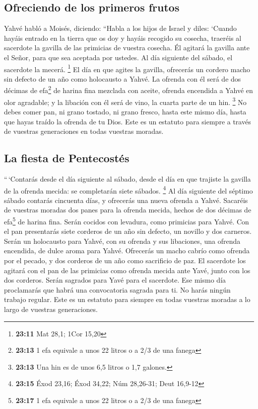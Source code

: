 \begin{paracol}{2}
\hypertarget{ofreciendo-de-los-primeros-frutos}{%
\subsection{Ofreciendo de los primeros
frutos}\label{ofreciendo-de-los-primeros-frutos}}

 Yahvé habló a Moisés, diciendo:  ``Habla a
los hijos de Israel y diles: `Cuando hayáis entrado en la tierra que os
doy y hayáis recogido su cosecha, traeréis al sacerdote la gavilla de
las primicias de vuestra cosecha.  Él agitará la gavilla
ante el Señor, para que sea aceptada por ustedes. Al día siguiente del
sábado, el sacerdote la mecerá. \footnote{\textbf{23:11} Mat 28,1; 1Cor
  15,20}  El día en que agites la gavilla, ofrecerás un
cordero macho sin defecto de un año como holocausto a Yahvé.
 La ofrenda con él será de dos décimas de efa\footnote{\textbf{23:13}
  1 efa equivale a unos 22 litros o a 2/3 de una fanega} de harina fina
mezclada con aceite, ofrenda encendida a Yahvé en olor agradable; y la
libación con él será de vino, la cuarta parte de un hin. \footnote{\textbf{23:13}
  Una hin es de unos 6,5 litros o 1,7 galones.}  No debes
comer pan, ni grano tostado, ni grano fresco, hasta este mismo día,
hasta que hayas traído la ofrenda de tu Dios. Este es un estatuto para
siempre a través de vuestras generaciones en todas vuestras moradas.

\hypertarget{la-fiesta-de-pentecostuxe9s}{%
\subsection{La fiesta de
Pentecostés}\label{la-fiesta-de-pentecostuxe9s}}

 ``\,`Contarás desde el día siguiente al sábado, desde el
día en que trajiste la gavilla de la ofrenda mecida: se completarán
siete sábados. \footnote{\textbf{23:15} Éxod 23,16; Éxod 34,22; Núm
  28,26-31; Deut 16,9-12}  Al día siguiente del séptimo
sábado contarás cincuenta días, y ofrecerás una nueva ofrenda a Yahvé.
 Sacaréis de vuestras moradas dos panes para la ofrenda
mecida, hechos de dos décimas de efa\footnote{\textbf{23:17} 1 efa
  equivale a unos 22 litros o a 2/3 de una fanega} de harina fina. Serán
cocidos con levadura, como primicias para Yahvé.  Con el
pan presentarás siete corderos de un año sin defecto, un novillo y dos
carneros. Serán un holocausto para Yahvé, con su ofrenda y sus
libaciones, una ofrenda encendida, de dulce aroma para Yahvé.
 Ofrecerás un macho cabrío como ofrenda por el pecado, y
dos corderos de un año como sacrificio de paz.  El
sacerdote los agitará con el pan de las primicias como ofrenda mecida
ante Yavé, junto con los dos corderos. Serán sagrados para Yavé para el
sacerdote.  Ese mismo día proclamarás que habrá una
convocatoria sagrada para ti. No harás ningún trabajo regular. Este es
un estatuto para siempre en todas vuestras moradas a lo largo de
vuestras generaciones.


\end{paracol}
